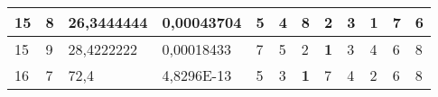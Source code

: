 \documentclass[conference]{IEEEtran}
\begin{document}
\begin{table*}[]
\begin{tabular}{|llll|llllllll|}
\multicolumn{1}{|l|}{15}                                                    & \multicolumn{1}{l|}{8}                                                        & \multicolumn{1}{l|}{26,3444444}                                                   & 0,00043704                     & \multicolumn{1}{l|}{5}                                                  & \multicolumn{1}{l|}{4}                                                  & \multicolumn{1}{l|}{8}                                                  & \multicolumn{1}{l|}{2}                                                  & \multicolumn{1}{l|}{3}                                                  & \multicolumn{1}{l|}{\textbf{1}}                                         & \multicolumn{1}{l|}{7}                                                  & 6                          \\ \hline
\multicolumn{1}{|l|}{15}                                                    & \multicolumn{1}{l|}{9}                                                        & \multicolumn{1}{l|}{28,4222222}                                                   & 0,00018433                     & \multicolumn{1}{l|}{7}                                                  & \multicolumn{1}{l|}{5}                                                  & \multicolumn{1}{l|}{2}                                                  & \multicolumn{1}{l|}{\textbf{1}}                                         & \multicolumn{1}{l|}{3}                                                  & \multicolumn{1}{l|}{4}                                                  & \multicolumn{1}{l|}{6}                                                  & 8                          \\ \hline
\multicolumn{1}{|l|}{16}                                                    & \multicolumn{1}{l|}{7}                                                        & \multicolumn{1}{l|}{72,4}                                                         & 4,8296E-13                     & \multicolumn{1}{l|}{5}                                                  & \multicolumn{1}{l|}{3}                                                  & \multicolumn{1}{l|}{\textbf{1}}                                         & \multicolumn{1}{l|}{7}                                                  & \multicolumn{1}{l|}{4}                                                  & \multicolumn{1}{l|}{2}                                                  & \multicolumn{1}{l|}{6}                                                  & 8                          \\ \hline

\end{tabular}
\end{table*}
\end{document}
